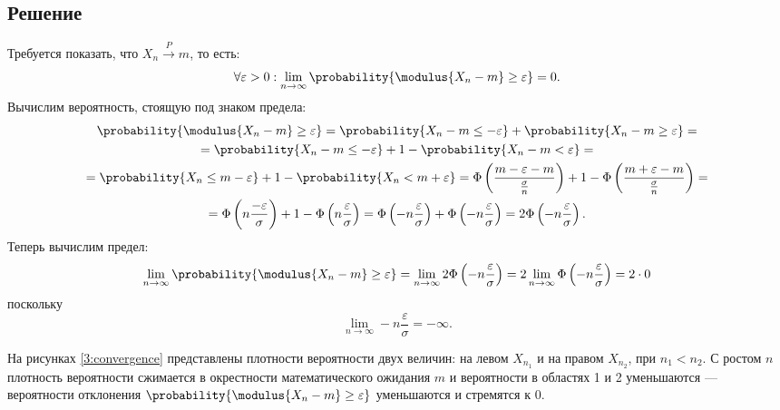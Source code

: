 \subsection*{Решение}
Требуется показать, что $X_n \stackrel{P}{\longrightarrow} m$, то есть:
\begin{equation}
    \forall \varepsilon > 0: \lim_{n \rightarrow \infty} \probability{ \modulus{ X_n - m } \ge \varepsilon } = 0 .
\end{equation}
Вычислим вероятность, стоящую под знаком предела:
\begin{multline}
    \probability{\modulus{ X_n - m } \ge \varepsilon}
    = \probability{X_n - m \le - \varepsilon} + \probability{X_n - m \ge \varepsilon} = \\
    = \probability{X_n - m \le - \varepsilon} + 1 - \probability{X_n - m < \varepsilon} = \\
    = \probability{X_n \le m - \varepsilon} + 1 - \probability{X_n < m + \varepsilon}
    = \Phi \left ( \frac{ m - \varepsilon - m}{\frac{\sigma}{n}} \right ) + 1 - \Phi \left ( \frac{m + \varepsilon - m}{\frac{\sigma}{n}} \right ) = \\
    = \Phi \left ( n \frac{-\varepsilon}{\sigma} \right ) + 1 - \Phi \left ( n \frac{\varepsilon}{\sigma} \right )
    = \Phi \left ( - n \frac{\varepsilon}{\sigma} \right ) + \Phi \left ( - n \frac{\varepsilon}{\sigma} \right )
    = 2 \Phi \left ( - n \frac{\varepsilon}{\sigma} \right ).
\end{multline}
Теперь вычислим предел:
\begin{equation}
    \lim_{n \rightarrow \infty} \probability{\modulus{ X_n - m } \ge \varepsilon}
    = \lim_{n \rightarrow \infty} 2 \Phi \left ( - n \frac{\varepsilon}{\sigma} \right )
    = 2 \lim_{n \rightarrow \infty} \Phi \left ( - n \frac{\varepsilon}{\sigma} \right )
    = 2 \cdot 0
\end{equation}
поскольку
\begin{equation}
    \lim_{n \rightarrow \infty} - n \frac{\varepsilon}{\sigma} = - \infty .
\end{equation}

На рисунках \ref{3:convergence} представлены плотности вероятности двух величин: на левом $X_{n_1}$ и на правом $X_{n_2}$, при $n_1 < n_2$. С ростом $n$ плотность
вероятности сжимается в окрестности математического ожидания $m$ и вероятности в областях 1 и 2 уменьшаются --- вероятности отклонения
$\probability{ \modulus{ X_n - m } \ge \varepsilon }$ уменьшаются и стремятся к 0.

